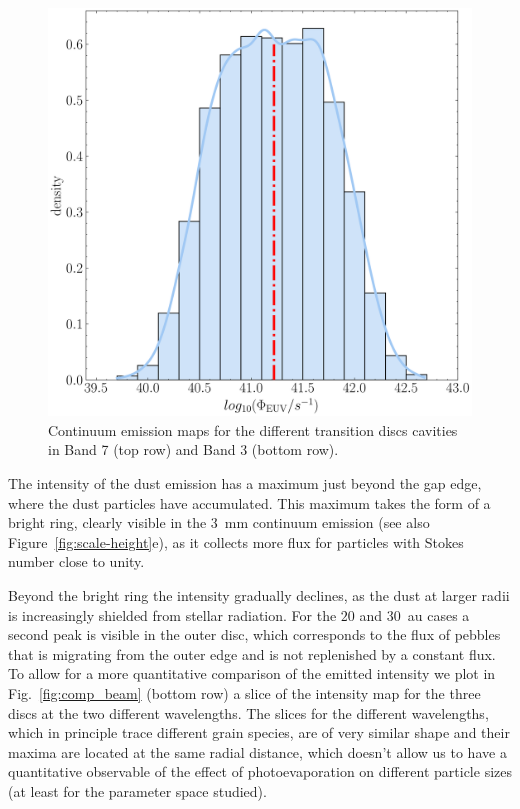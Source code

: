 \documentclass[fleqn,usenatbib]{mnras}
\begin{document}
        \begin{figure}
            \centering
            \includegraphics[width=\textwidth]{Fig4}
            \caption{Continuum emission maps for the different transition discs cavities in Band 7 (top row) and Band 3 (bottom row).}
            \label{fig:DustContinuum}
        \end{figure}
        
        The intensity of the dust emission has a maximum just beyond the gap edge, where the dust particles have accumulated. This maximum takes the form of a bright ring, clearly visible in the \SI{3}{mm} continuum emission (see also Figure~\ref{fig:scale-height}e), as it collects more flux for particles with Stokes number close to unity.
        
        Beyond the bright ring the intensity gradually declines, as the dust at larger radii is increasingly shielded from stellar radiation. For the $20$ and \SI{30}{au} cases a second peak is visible in the outer disc, which corresponds to the flux of pebbles that is migrating from the outer edge and is not replenished by a constant flux.
        To allow for a more quantitative comparison of the emitted intensity we plot in Fig.~\ref{fig:comp_beam} (bottom row) a slice of the intensity map for the three discs at the two different wavelengths.
        The slices for the different wavelengths, which in principle trace different grain species, are of very similar shape and their maxima are located at the same radial distance, which doesn't allow us to have a quantitative observable of the effect of photoevaporation on different particle sizes (at least for the parameter space studied).
         
\end{document}
